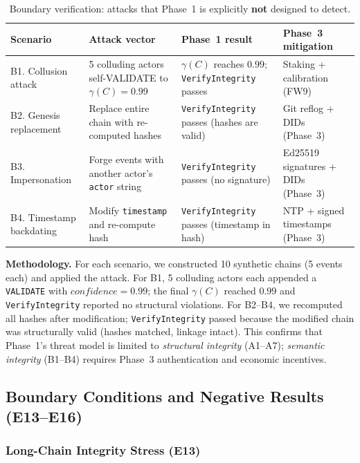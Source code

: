 \begin{table}[htbp]
\centering
\caption{Boundary verification: attacks that Phase~1 is explicitly \textbf{not} designed to detect.}
\label{tab:undetectable-attacks-full}
\begin{tabular}{@{}llll@{}}
\toprule
\textbf{Scenario} & \textbf{Attack vector} & \textbf{Phase~1 result} & \textbf{Phase~3 mitigation} \\
\midrule
B1. Collusion attack & 5 colluding actors self-VALIDATE to $\gamma(C)=0.99$ & $\gamma(C)$ reaches $0.99$; \texttt{VerifyIntegrity} passes & Staking + calibration (FW9) \\
B2. Genesis replacement & Replace entire chain with re-computed hashes & \texttt{VerifyIntegrity} passes (hashes are valid) & Git reflog + DIDs (Phase~3) \\
B3. Impersonation & Forge events with another actor's \texttt{actor} string & \texttt{VerifyIntegrity} passes (no signature) & Ed25519 signatures + DIDs (Phase~3) \\
B4. Timestamp backdating & Modify \texttt{timestamp} and re-compute hash & \texttt{VerifyIntegrity} passes (timestamp in hash) & NTP + signed timestamps (Phase~3) \\
\bottomrule
\end{tabular}
\end{table}

\textbf{Methodology.} For each scenario, we constructed 10 synthetic chains (5 events each) and applied the attack. For B1, 5 colluding actors each appended a \texttt{VALIDATE} with $\mathit{confidence}=0.99$; the final $\gamma(C)$ reached $0.99$ and \texttt{VerifyIntegrity} reported no structural violations. For B2--B4, we recomputed all hashes after modification; \texttt{VerifyIntegrity} passed because the modified chain was structurally valid (hashes matched, linkage intact). This confirms that Phase~1's threat model is limited to \emph{structural integrity} (A1--A7); \emph{semantic integrity} (B1--B4) requires Phase~3 authentication and economic incentives.

\subsection{Boundary Conditions and Negative Results (E13--E16)}

\subsubsection{Long-Chain Integrity Stress (E13)}

